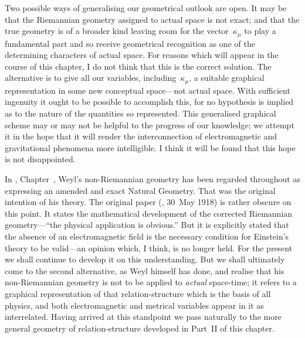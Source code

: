 \documentclass[12pt]{book}
\begin{document}
Two possible ways of generalising our geometrical outlook are open. It
may be that the Riemannian geometry assigned to actual space is not exact;
and that the true geometry is of a broader kind leaving room for the vector~$\kappa_{\mu}$
to play a fundamental part and so receive geometrical recognition as one
of the determining characters of actual space. For reasons which will appear
in the course of this chapter, I do not think that this is the correct solution.
The alternative is to give all our variables, including~$\kappa_{\mu}$, a suitable graphical
representation in some new conceptual space---not actual space. With sufficient
ingenuity it ought to be possible to accomplish this, for no hypothesis is implied
as to the nature of the quantities so represented. This generalised graphical
scheme may or may not be helpful to the progress of our knowledge; we
attempt it in the hope that it will render the interconnection of electromagnetic
and gravitational phenomena more intelligible. I think it will be found
that this hope is not disappointed.

In , Chapter~, Weyl's non\hyp{}Riemannian
geometry has been regarded throughout as expressing an amended and
exact Natural Geometry. That was the original intention of his theory\footnotemark.\footnotetext
  {The original paper (, 30~May 1918) is rather obscure on this point.
  It states the mathematical development of the corrected Riemannian geometry---``the physical
  application is obvious.'' But it is explicitly stated that the absence of an electromagnetic field is
  the necessary condition for Einstein's theory to be valid---an opinion which, I think, is no longer
  held.}
For the present we shall continue to develop it on this understanding. But
we shall ultimately come to the second alternative, as Weyl himself has done,
and realise that his non\hyp{}Riemannian geometry is not to be applied to \emph{actual}
%
space-time; it refers to a graphical representation of that relation-structure
which is the basis of all physics, and both electromagnetic and metrical
variables appear in it as interrelated. Having arrived at this standpoint we
pass naturally to the more general geometry of relation-structure developed
in Part~II of this chapter.%
\end{document}
